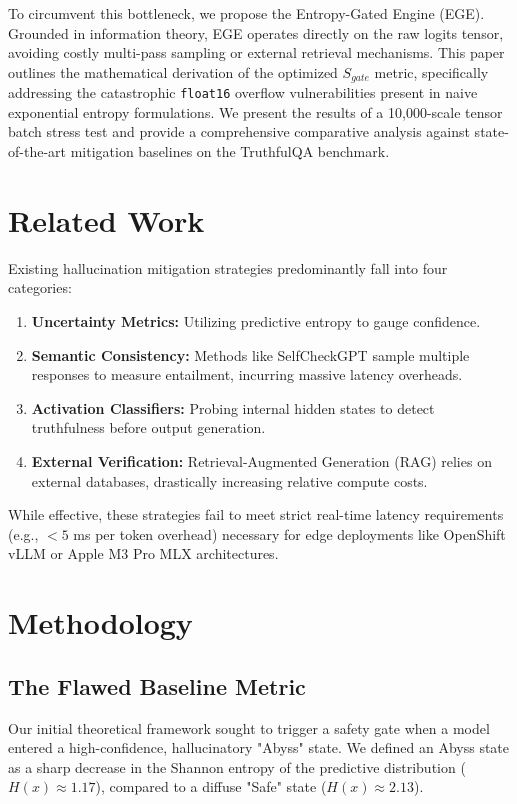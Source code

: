 \documentclass[conference,compsoc]{IEEEtran}
\begin{document}
To circumvent this bottleneck, we propose the Entropy-Gated Engine (EGE). Grounded in information theory, EGE operates directly on the raw logits tensor, avoiding costly multi-pass sampling or external retrieval mechanisms. This paper outlines the mathematical derivation of the optimized $S_{gate}$ metric, specifically addressing the catastrophic \texttt{float16} overflow vulnerabilities present in naive exponential entropy formulations. We present the results of a 10,000-scale tensor batch stress test and provide a comprehensive comparative analysis against state-of-the-art mitigation baselines on the TruthfulQA benchmark.

\section{Related Work}
Existing hallucination mitigation strategies predominantly fall into four categories:
\begin{enumerate}
    \item \textbf{Uncertainty Metrics:} Utilizing predictive entropy \citep{kadavath2022language} to gauge confidence.
    \item \textbf{Semantic Consistency:} Methods like SelfCheckGPT \citep{manakul2023selfcheckgpt} sample multiple responses to measure entailment, incurring massive latency overheads.
    \item \textbf{Activation Classifiers:} Probing internal hidden states \citep{zou2023representation} to detect truthfulness before output generation.
    \item \textbf{External Verification:} Retrieval-Augmented Generation (RAG) \citep{lewis2020retrieval} relies on external databases, drastically increasing relative compute costs.
\end{enumerate}
While effective, these strategies fail to meet strict real-time latency requirements (e.g., $<5$ ms per token overhead) necessary for edge deployments like OpenShift vLLM or Apple M3 Pro MLX architectures.

\section{Methodology}
\subsection{The Flawed Baseline Metric}
Our initial theoretical framework sought to trigger a safety gate when a model entered a high-confidence, hallucinatory "Abyss" state. We defined an Abyss state as a sharp decrease in the Shannon entropy of the predictive distribution ($H(x) \approx 1.17$), compared to a diffuse "Safe" state ($H(x) \approx 2.13$).
\end{document}
